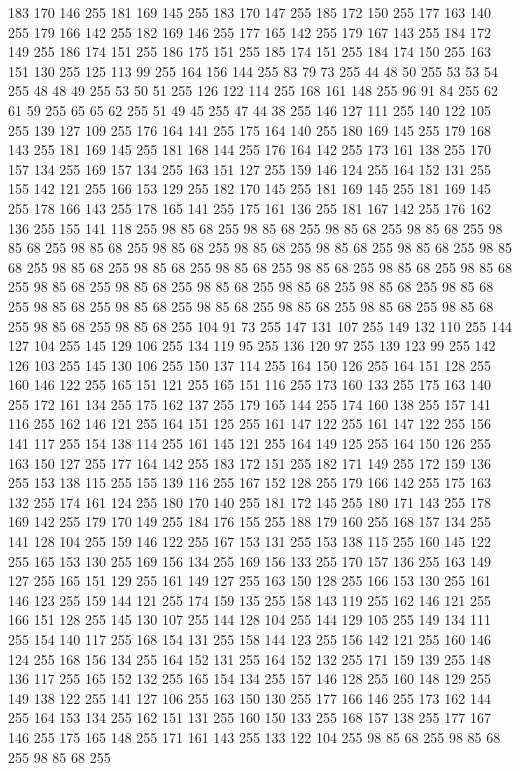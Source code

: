 183 170 146 255 181 169 145 255 183 170 147 255 185 172 150 255 177 163 140 255 179 166 142 255 182 169 146 255 177 165 142 255 179 167 143 255 184 172 149 255 186 174 151 255 186 175 151 255 185 174 151 255 184 174 150 255 163 151 130 255 125 113 99 255 164 156 144 255 83 79 73 255 44 48 50 255 53 53 54 255 48 48 49 255 53 50 51 255 126 122 114 255 168 161 148 255 96 91 84 255 62 61 59 255 65 65 62 255 51 49 45 255 47 44 38 255 146 127 111 255 140 122 105 255 139 127 109 255 176 164 141 255 175 164 140 255 180 169 145 255 179 168 143 255 181 169 145 255 181 168 144 255 176 164 142 255 173 161 138 255 170 157 134 255 169 157 134 255 163 151 127 255 159 146 124 255 164 152 131 255 155 142 121 255 166 153 129 255 182 170 145 255 181 169 145 255 181 169 145 255 178 166 143 255 178 165 141 255 175 161 136 255 181 167 142 255 176 162 136 255 155 141 118 255 98 85 68 255 98 85 68 255 98 85 68 255 98 85 68 255 98 85 68 255 98 85 68 255 98 85 68 255 98 85 68 255
98 85 68 255 98 85 68 255 98 85 68 255 98 85 68 255 98 85 68 255 98 85 68 255 98 85 68 255 98 85 68 255 98 85 68 255 98 85 68 255 98 85 68 255 98 85 68 255 98 85 68 255 98 85 68 255 98 85 68 255 98 85 68 255 98 85 68 255 98 85 68 255 98 85 68 255 98 85 68 255 98 85 68 255 98 85 68 255 98 85 68 255 104 91 73 255 147 131 107 255 149 132 110 255 144 127 104 255 145 129 106 255 134 119 95 255 136 120 97 255 139 123 99 255 142 126 103 255 145 130 106 255 150 137 114 255 164 150 126 255 164 151 128 255 160 146 122 255 165 151 121 255 165 151 116 255 173 160 133 255 175 163 140 255 172 161 134 255 175 162 137 255 179 165 144 255 174 160 138 255 157 141 116 255 162 146 121 255 164 151 125 255 161 147 122 255 161 147 122 255 156 141 117 255 154 138 114 255 161 145 121 255 164 149 125 255 164 150 126 255 163 150 127 255 177 164 142 255 183 172 151 255 182 171 149 255 172 159 136 255 153 138 115 255 155 139 116 255 167 152 128 255 179 166 142 255
175 163 132 255 174 161 124 255 180 170 140 255 181 172 145 255 180 171 143 255 178 169 142 255 179 170 149 255 184 176 155 255 188 179 160 255 168 157 134 255 141 128 104 255 159 146 122 255 167 153 131 255 153 138 115 255 160 145 122 255 165 153 130 255 169 156 134 255 169 156 133 255 170 157 136 255 163 149 127 255 165 151 129 255 161 149 127 255 163 150 128 255 166 153 130 255 161 146 123 255 159 144 121 255 174 159 135 255 158 143 119 255 162 146 121 255 166 151 128 255 145 130 107 255 144 128 104 255 144 129 105 255 149 134 111 255 154 140 117 255 168 154 131 255 158 144 123 255 156 142 121 255 160 146 124 255 168 156 134 255 164 152 131 255 164 152 132 255 171 159 139 255 148 136 117 255 165 152 132 255 165 154 134 255 157 146 128 255 160 148 129 255 149 138 122 255 141 127 106 255 163 150 130 255 177 166 146 255 173 162 144 255 164 153 134 255 162 151 131 255 160 150 133 255 168 157 138 255 177 167 146 255 175 165 148 255 171 161 143 255 133 122 104 255 98 85 68 255 98 85 68 255 98 85 68 255
